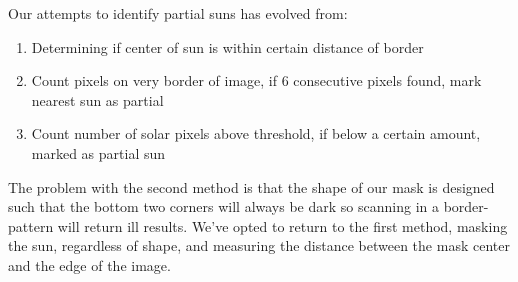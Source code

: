 \documentclass[10pt]{scrartcl}
\begin{document}
Our attempts to identify partial suns has evolved from:

\begin{enumerate}
    \item Determining if center of sun is within certain distance of border
    \item Count pixels on very border of image, if 6 consecutive pixels found, mark nearest sun as partial
    \item Count number of solar pixels above threshold, if below a certain amount, marked as partial sun
\end{enumerate}

The problem with the second method is that the shape of our mask is designed such that the bottom two corners will always be dark so scanning in a border-pattern will return ill results. We've opted to return to the first method, masking the sun, regardless of shape, and measuring the distance between the mask center and the edge of the image. 

\begin{figure}[!ht]
\end{figure}
\end{document}
